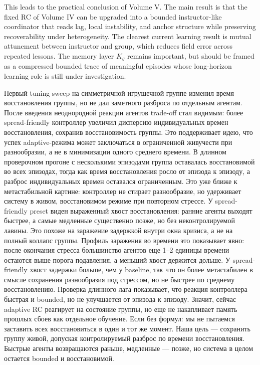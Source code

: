 ﻿\documentclass[12pt,a4paper]{article}
\begin{document}
This leads to the practical conclusion of Volume V. The main result is that the fixed RC of Volume IV can be upgraded into a bounded instructor-like coordinator that reads lag, local instability, and anchor structure while preserving recoverability under heterogeneity. The clearest current learning result is mutual attunement between instructor and group, which reduces field error across repeated lessons. The memory layer $K_g$ remains important, but should be framed as a compressed bounded trace of meaningful episodes whose long-horizon learning role is still under investigation.

\par
Первый tuning sweep на симметричной игрушечной группе изменил время восстановления группы, но не дал заметного разброса по отдельным агентам. После введения неоднородной реакции агентов trade-off стал видимым: более spread-friendly контроллер увеличил дисперсию индивидуальных времен восстановления, сохранив восстановимость группы. Это поддерживает идею, что успех adaptive-режима может заключаться в ограниченной живучести при разнообразии, а не в минимизации одного среднего времени.
В длинном проверочном прогоне с несколькими эпизодами группа оставалась восстановимой во всех эпизодах, тогда как время восстановления росло от эпизода к эпизоду, а разброс индивидуальных времен оставался ограниченным. Это уже ближе к метастабильной картине: контроллер не стирает разнообразие, но удерживает систему в живом, восстановимом режиме при повторном стрессе.
У spread-friendly preset виден выраженный хвост восстановления: ранние агенты выходят быстрее, а самые медленные существенно позже, но без неконтролируемой лавины. Это похоже на заражение задержкой внутри окна кризиса, а не на полный коллапс группы.
Профиль заражения во времени это показывает явно: после окончания стресса большинство агентов еще 1–2 единицы времени остаются выше порога подавления, а меньший хвост держится дольше. У spread-friendly хвост задержки больше, чем у baseline, так что он более метастабилен в смысле сохранения разнообразия под стрессом, но не быстрее по среднему восстановлению.
Проверка длинного лага показывает, что реакция контроллера быстрая и bounded, но не улучшается от эпизода к эпизоду. Значит, сейчас adaptive RC реагирует на состояние группы, но еще не накапливает память прошлых сбоев как отдельное обучение.
Если без формул: мы не пытаемся заставить всех восстановиться в один и тот же момент. Наша цель — сохранить группу живой, допуская контролируемый разброс по времени восстановления. Быстрые агенты возвращаются раньше, медленные — позже, но система в целом остается bounded и восстановимой.
\end{document}
